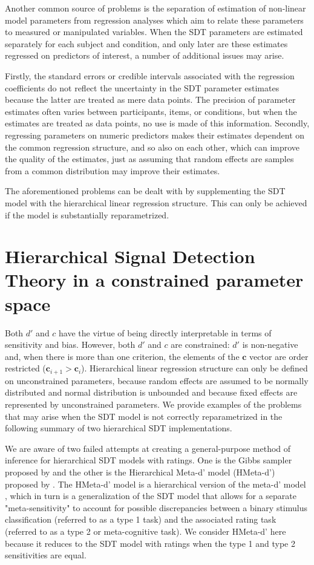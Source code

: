 \documentclass[a4paper,man,apacite,floatsintext]{apa6}
\begin{document}
Another common source of problems is the separation of estimation of
non-linear model parameters from regression analyses which aim to
relate these parameters to measured or manipulated variables. When the
SDT parameters are estimated separately for each subject and
condition, and only later are these estimates regressed on predictors
of interest, a number of additional issues may arise.

Firstly, the standard errors or credible intervals associated with the
regression coefficients do not reflect the uncertainty in the SDT
parameter estimates because the latter are treated as mere data
points. The precision of parameter estimates often varies between
participants, items, or conditions, but when the estimates are treated
as data points, no use is made of this information. Secondly,
regressing parameters on numeric predictors makes their estimates
dependent on the common regression structure, and so also on each
other, which can improve the quality of the estimates, just as
assuming that random effects are samples from a common distribution
may improve their estimates.

The aforementioned problems can be dealt with by supplementing the SDT
model with the hierarchical linear regression structure. This can only
be achieved if the model is substantially reparametrized.

\section{Hierarchical Signal Detection Theory in a constrained
  parameter space}

Both $d'$ and $c$ have the virtue of being directly interpretable in
terms of sensitivity and bias. However, both $d'$ and $c$ are
constrained: $d'$ is non-negative and, when there is more than one
criterion, the elements of the $\bm{c}$ vector are order restricted
($\bm{c}_{i+1} > \bm{c}_i$). Hierarchical linear regression structure
can only be defined on unconstrained parameters, because random
effects are assumed to be normally distributed and normal distribution
is unbounded and because fixed effects are represented by
unconstrained parameters. We provide examples of the problems that may
arise when the SDT model is not correctly reparametrized in the
following summary of two hierarchical SDT implementations.

We are aware of two failed attempts at creating a general-purpose
method of inference for hierarchical SDT models with ratings. One is
the Gibbs sampler proposed by  and the
other is the Hierarchical Meta-d' model (HMeta-d') proposed by
. The HMeta-d' model is a hierarchical version of the
meta-d' model \cite{maniscalco2012signal}, which in turn is a
generalization of the SDT model that allows for a separate
"meta-sensitivity" to account for possible discrepancies between a
binary stimulus classification (referred to as a type 1 task) and the
associated rating task (referred to as a type 2 or meta-cognitive
task). We consider HMeta-d' here because it reduces to the SDT model
with ratings when the type 1 and type 2 sensitivities are equal.
\end{document}
